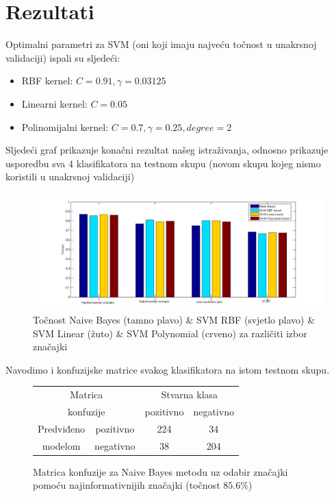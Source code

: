 \documentclass[conference]{IEEEtran}
\begin{document}
\section{Rezultati}

Optimalni parametri za SVM (oni koji imaju najveću točnost u unakrsnoj
validaciji) ispali su sljedeći:

\begin{itemize}
  \item RBF kernel: $C=0.91, \gamma =0.03125$
  \item Linearni kernel: $C=0.05$
  \item Polinomijalni kernel: $C=0.7, \gamma =0.25, degree=2$
\end{itemize}

Sljedeći graf prikazuje konačni rezultat našeg istraživanja, odnosno prikazuje
usporedbu sva 4 klasifikatora na testnom skupu (novom skupu kojeg nismo
koristili u unakrsnoj validaciji)

\begin{figure}[H]
\begin{minipage}{0.5\textwidth}
\centering
\includegraphics[width=\textwidth]{images/SVM_tocnost.png}
\caption{Točnost Naive Bayes (tamno plavo) \& SVM RBF (svjetlo plavo) \& SVM Linear (žuto) \& SVM Polynomial (crveno) za različiti izbor značajki}
\end{minipage}
\end{figure}

Navodimo i konfuzijske matrice svakog klasifikatora na istom testnom skupu.

\begin{figure}[H]
\begin{minipage}{0.5\textwidth}
\centering
\begin{tabular}{|c|c|c|c|}
  \hline
  \multicolumn{2}{|c|}{Matrica}  & \multicolumn{2}{|c|}{Stvarna klasa} \\ 
  \cline{3-4}
  \multicolumn{2}{|c|}{konfuzije} & pozitivno & negativno \\ 
  \hline
  Predviđeno & pozitivno & 224 & 34 \\
  \cline{2-4}
  modelom & negativno & 38 & 204 \\
  \hline
\end{tabular}
\caption{Matrica konfuzije za Naive Bayes metodu uz odabir značajki pomoću najinformativnijih značajki (točnost $85.6\%$)}
\end{minipage}
\end{figure}
\end{document}
